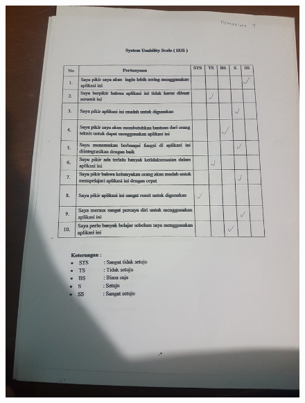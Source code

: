 \begin{figure}[H]
	\center
	\includegraphics [width = 17cm,angle=-90]{gambar/pengujian/pangkalan4}
\end{figure}
